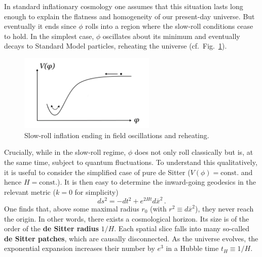 \documentclass[12pt]{article}
\newcommand{\be}{\begin{equation}}
\newcommand{\ee}{\end{equation}}
\newcommand{\ol}{\overline}
\numberwithin{equation}{section}
\begin{document}
In standard inflationary cosmology one assumes that this situation lasts long enough to explain the flatness and homogeneity of our present-day universe. But eventually it ends since $\phi$ rolls into a region where the slow-roll conditions cease to hold. In the simplest case, $\phi$ oscillates about its minimum and eventually decays to Standard Model particles, reheating the universe (cf.~Fig.~\ref{inf}).

\begin{figure}[ht]
\begin{center} 
\includegraphics[width=6.5cm]{inf.png}
\caption{Slow-roll inflation ending in field oscillations and reheating.}
\label{inf} 
\end{center}
\end{figure}

Crucially, while in the slow-roll regime, $\phi$ does not only roll classically but is, at the same time, subject to quantum fluctuations. To understand this qualitatively, it is useful to consider the simplified case of pure de Sitter ($V(\phi)=\mbox{const.}$ and hence $H=\mbox{const.}$). It is then easy to determine the inward-going geodesics in the relevant metric ($k=0$ for simplicity)
\be
ds^2=-dt^2+e^{2Ht}d\ol{x}^2\,.
\ee
One finds that, above some maximal radius $r_0$ (with $r^2\equiv d\ol{x}^2$), they never reach the origin. In other words, there exists a cosmological horizon. Its size is of the order of the {\bf de Sitter radius} $1/H$. Each spatial slice falls into many so-called {\bf de Sitter patches}, which are causally disconnected. As the universe evolves, the exponential expansion increases their number by $e^3$ in a Hubble time $t_H\equiv 1/H$. 
\end{document}
